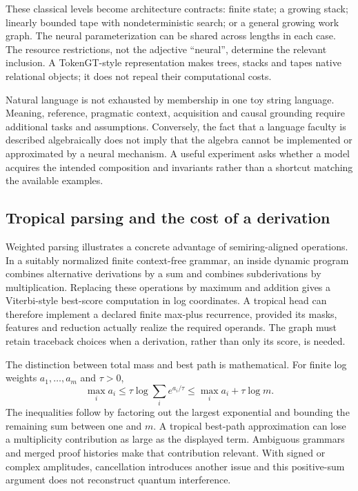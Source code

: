These classical levels become architecture contracts: finite state; a growing stack; linearly bounded tape with nondeterministic search; or a general growing work graph. The neural parameterization can be shared across lengths in each case. The resource restrictions, not the adjective ``neural'', determine the relevant inclusion. A TokenGT-style representation makes trees, stacks and tapes native relational objects; it does not repeal their computational costs.

Natural language is not exhausted by membership in one toy string language. Meaning, reference, pragmatic context, acquisition and causal grounding require additional tasks and assumptions. Conversely, the fact that a language faculty is described algebraically does not imply that the algebra cannot be implemented or approximated by a neural mechanism. A useful experiment asks whether a model acquires the intended composition and invariants rather than a shortcut matching the available examples.

\subsection{Tropical parsing and the cost of a derivation}

Weighted parsing illustrates a concrete advantage of semiring-aligned operations. In a suitably normalized finite context-free grammar, an inside dynamic program combines alternative derivations by a sum and combines subderivations by multiplication. Replacing these operations by maximum and addition gives a Viterbi-style best-score computation in log coordinates. A tropical head can therefore implement a declared finite max-plus recurrence, provided its masks, features and reduction actually realize the required operands. The graph must retain traceback choices when a derivation, rather than only its score, is needed.

The distinction between total mass and best path is mathematical. For finite log weights $a_1,\ldots,a_m$ and $\tau>0$,
\[
 \max_i a_i\le\tau\log\sum_i e^{a_i/\tau}
 \le\max_i a_i+\tau\log m.
\]
The inequalities follow by factoring out the largest exponential and bounding the remaining sum between one and $m$. A tropical best-path approximation can lose a multiplicity contribution as large as the displayed term. Ambiguous grammars and merged proof histories make that contribution relevant. With signed or complex amplitudes, cancellation introduces another issue and this positive-sum argument does not reconstruct quantum interference.

